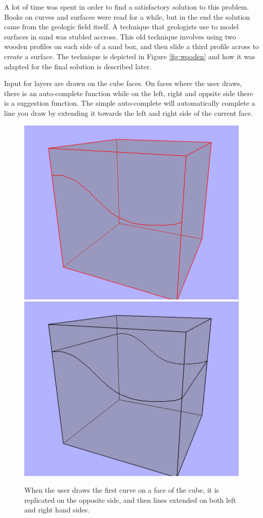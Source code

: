 \documentclass[a4paper,12pt]{report}
\begin{document}
A lot of time was spent in order to find a satisfactory solution to this problem. Books on curves and surfaces were read for a while, but in the end the solution came from the geologic field itself. A technique that geologists use to model surfaces in sand was stubled accross. This old technique involves using two wooden profiles on each side of a sand box, and then slide a third profile across to create a surface. The technique is depicted in Figure \ref{fig:wooden} and how it was adapted for the final solution is described later. 


Input for layers are drawn on the cube faces. On faces where the user draws, there is an auto-complete function while on the left, right and oppsite side there is a suggestion function. The simple auto-complete will automatically complete a line you draw by extending it towards the left and right side of the current face. 

\begin{figure}
\includegraphics[width=.5\linewidth]{thesis/suggestion1.png}
\includegraphics[width=.5\linewidth]{thesis/suggestion2.png}
 \caption{When the user draws the first curve on a face of the cube, it is replicated on the opposite side, and then lines extended on both left and right hand sides.}
 \label{fig:suggest}
\end{figure}
\end{document}
